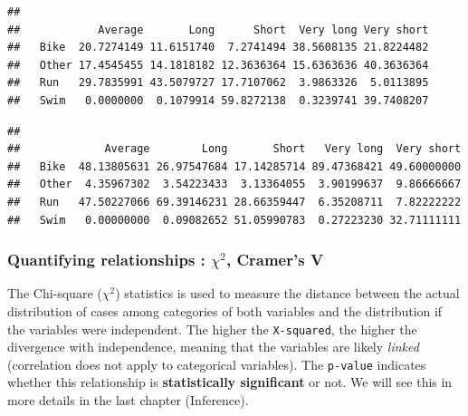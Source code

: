 \documentclass[
]{book}
\newenvironment{Shaded}{\begin{snugshade}}{\end{snugshade}}
\newcommand{\DataTypeTok}[1]{\textcolor[rgb]{0.13,0.29,0.53}{#1}}
\newcommand{\DecValTok}[1]{\textcolor[rgb]{0.00,0.00,0.81}{#1}}
\newcommand{\KeywordTok}[1]{\textcolor[rgb]{0.13,0.29,0.53}{\textbf{#1}}}
\newcommand{\NormalTok}[1]{#1}
\newcommand{\OperatorTok}[1]{\textcolor[rgb]{0.81,0.36,0.00}{\textbf{#1}}}
\newcommand{\StringTok}[1]{\textcolor[rgb]{0.31,0.60,0.02}{#1}}
\begin{document}
\begin{verbatim}
##        
##            Average       Long      Short  Very long Very short
##   Bike  20.7274149 11.6151740  7.2741494 38.5608135 21.8224482
##   Other 17.4545455 14.1818182 12.3636364 15.6363636 40.3636364
##   Run   29.7835991 43.5079727 17.7107062  3.9863326  5.0113895
##   Swim   0.0000000  0.1079914 59.8272138  0.3239741 39.7408207
\end{verbatim}

\begin{Shaded}
\end{Shaded}

\begin{verbatim}
##        
##             Average        Long       Short   Very long  Very short
##   Bike  48.13805631 26.97547684 17.14285714 89.47368421 49.60000000
##   Other  4.35967302  3.54223433  3.13364055  3.90199637  9.86666667
##   Run   47.50227066 69.39146231 28.66359447  6.35208711  7.82222222
##   Swim   0.00000000  0.09082652 51.05990783  0.27223230 32.71111111
\end{verbatim}

\hypertarget{quantifying-relationships-chi2-cramers-v}{%
\subsubsection{\texorpdfstring{Quantifying relationships : \(\chi^2\), Cramer's V}{Quantifying relationships : \textbackslash chi\^{}2, Cramer's V}}\label{quantifying-relationships-chi2-cramers-v}}

The Chi-square (\(\chi^2\)) statistics is used to measure the distance between the actual distribution of cases among categories of both variables and the distribution if the variables were independent. The higher the \texttt{X-squared}, the higher the divergence with independence, meaning that the variables are likely \emph{linked} (correlation does not apply to categorical variables). The \texttt{p-value} indicates whether this relationship is \textbf{statistically significant} or not. We will see this in more details in the last chapter (Inference).
\end{document}
